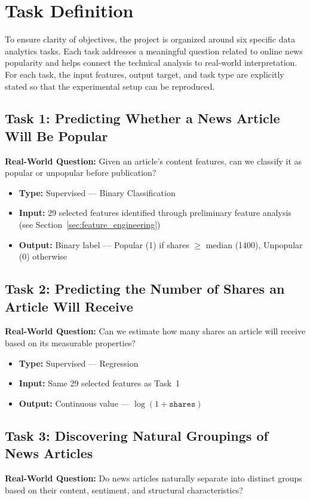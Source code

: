 \section{Task Definition}

To ensure clarity of objectives, the project is organized around six specific data analytics tasks. Each task addresses a meaningful question related to online news popularity and helps connect the technical analysis to real-world interpretation. For each task, the input features, output target, and task type are explicitly stated so that the experimental setup can be reproduced.

\subsection{Task 1: Predicting Whether a News Article Will Be Popular}
\textbf{Real-World Question:} Given an article's content features, can we classify it as popular or unpopular before publication?

\begin{itemize}[leftmargin=1.5em]
    \item \textbf{Type:} Supervised --- Binary Classification
    \item \textbf{Input:} 29 selected features identified through preliminary feature analysis (see Section~\ref{sec:feature_engineering})
    \item \textbf{Output:} Binary label --- Popular (1) if shares $\geq$ median (1400), Unpopular (0) otherwise
\end{itemize}

\subsection{Task 2: Predicting the Number of Shares an Article Will Receive}
\textbf{Real-World Question:} Can we estimate how many shares an article will receive based on its measurable properties?

\begin{itemize}[leftmargin=1.5em]
    \item \textbf{Type:} Supervised --- Regression
    \item \textbf{Input:} Same 29 selected features as Task~1
    \item \textbf{Output:} Continuous value --- $\log(1 + \texttt{shares})$
\end{itemize}

\subsection{Task 3: Discovering Natural Groupings of News Articles}
\textbf{Real-World Question:} Do news articles naturally separate into distinct groups based on their content, sentiment, and structural characteristics?

